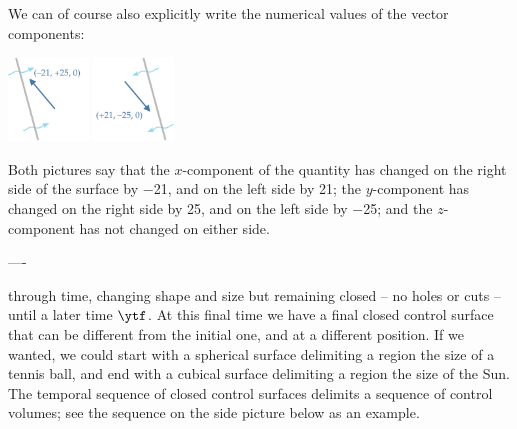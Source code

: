 
\medskip

We can of course also explicitly write the numerical values of the vector components:\noprelistbreak
\begin{center}\label{fig:vector_fluxes_components}
  \bigskip
  \hspace*{\fill}
  \includegraphics[align=c,height=6em]{images/flux_vec_right_num.pdf}
\qquad
\includegraphics[align=c,height=6em]{images/flux_vec_left_num.pdf}
\hspace*{\fill}
\end{center}
Both pictures say that the $x$-component of the quantity has changed on the right side of the surface by \num{-21}, and on the left side by \num{+21}; the $y$-component  has changed on the right side by \num{+25}, and on the left side by \num{-25}; and the $z$-component has not changed on either side.


----

through time, changing shape and size but remaining closed -- no holes or cuts -- until a later time $\ytf$. At this final time we have a final closed control surface that can be different from the initial one, and at a different position. If we wanted, we could start with a spherical surface delimiting a region the size of a tennis ball, and end with a cubical surface delimiting a region the size of the Sun. The temporal sequence of closed control surfaces delimits a sequence of control volumes; see the sequence on the side picture below as an example.


